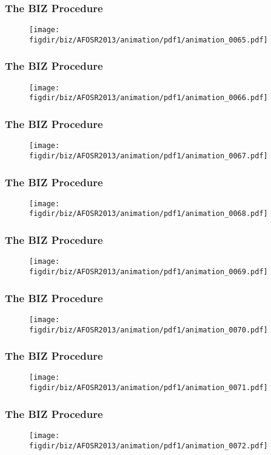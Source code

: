 \documentclass[13pt]{beamer}
\newcommand{\figdir}{../../fig}
\begin{document}
\begin{frame}\frametitle{The BIZ Procedure}\begin{figure}\texttt{[image: \\figdir/biz/AFOSR2013/animation/pdf1/animation\_0065.pdf]}\end{figure}\end{frame}
\begin{frame}\frametitle{The BIZ Procedure}\begin{figure}\texttt{[image: \\figdir/biz/AFOSR2013/animation/pdf1/animation\_0066.pdf]}\end{figure}\end{frame}
\begin{frame}\frametitle{The BIZ Procedure}\begin{figure}\texttt{[image: \\figdir/biz/AFOSR2013/animation/pdf1/animation\_0067.pdf]}\end{figure}\end{frame}
\begin{frame}\frametitle{The BIZ Procedure}\begin{figure}\texttt{[image: \\figdir/biz/AFOSR2013/animation/pdf1/animation\_0068.pdf]}\end{figure}\end{frame}
\begin{frame}\frametitle{The BIZ Procedure}\begin{figure}\texttt{[image: \\figdir/biz/AFOSR2013/animation/pdf1/animation\_0069.pdf]}\end{figure}\end{frame}
\begin{frame}\frametitle{The BIZ Procedure}\begin{figure}\texttt{[image: \\figdir/biz/AFOSR2013/animation/pdf1/animation\_0070.pdf]}\end{figure}\end{frame}
\begin{frame}\frametitle{The BIZ Procedure}\begin{figure}\texttt{[image: \\figdir/biz/AFOSR2013/animation/pdf1/animation\_0071.pdf]}\end{figure}\end{frame}
\begin{frame}\frametitle{The BIZ Procedure}\begin{figure}\texttt{[image: \\figdir/biz/AFOSR2013/animation/pdf1/animation\_0072.pdf]}\end{figure}\end{frame}
\end{document}
